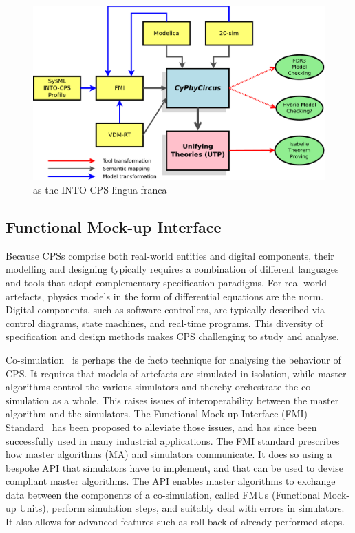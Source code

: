 \begin{figure}
  \begin{center}
    \includegraphics[width=14cm]{CyPhyCircus}
  \end{center}
  \caption{\CyPhyCircus as the INTO-CPS lingua franca}
  \label{fig:CyPhyCircus}
\end{figure}

\subsection{Functional Mock-up Interface}%

Because CPSs comprise both real-world entities and digital components, their modelling and designing typically requires a combination of different languages and tools that adopt complementary specification paradigms. For real-world artefacts, physics models in the form of differential equations are the norm. Digital components, such as software controllers, are typically described via control diagrams, state machines, and real-time programs. This diversity of specification and design methods makes CPS challenging to study and analyse.

Co-simulation~\cite{GomesTBLV2017} is perhaps the de facto technique for analysing the behaviour of CPS. 
It requires that models of artefacts are simulated in isolation, while master algorithms control the various simulators and thereby orchestrate the co-simulation as a whole. This raises issues of interoperability between the master algorithm and the simulators. The Functional Mock-up Interface (FMI) Standard~\cite{Blochwitz2011} has been proposed to alleviate those issues, and has since been successfully used in many industrial applications.  The FMI standard prescribes how master algorithms (MA) and simulators communicate. It does so using a bespoke API that simulators have to implement, and that can be used to devise compliant master algorithms. The API enables master algorithms to exchange data between the components of a co-simulation, called FMUs (Functional Mock-up Units), perform simulation steps, and suitably deal with errors in simulators. It also allows for advanced features such as roll-back of already performed steps.


